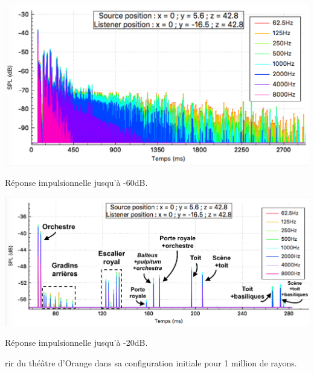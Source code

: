 \begin{figureth}
	\begin{subfigureth}{\linewidth}
		\includegraphics[width=\linewidth]{images/rirTheatreAvecDecor}
			\caption{Réponse impulsionnelle jusqu'à -60dB.}
		\label{rirTheatre60}
	\end{subfigureth}
		\begin{subfigureth}{\linewidth}
		\includegraphics[width=\linewidth]{images/rirTheatre20}
		\caption{Réponse impulsionnelle jusqu'à -20dB.}
		\label{rirTheatre20}
	\end{subfigureth}
	\caption{\gls{rir} du théâtre d'Orange dans sa configuration initiale pour 1 million de rayons.}
	\label{rirTheatre}
\end{figureth}

